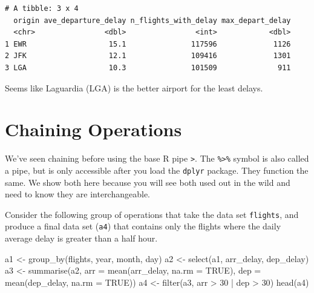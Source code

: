 \documentclass[
  letterpaper,
  DIV=11,
  numbers=noendperiod,
  oneside]{scrreprt}
\newenvironment{Shaded}{\begin{snugshade}}{\end{snugshade}}
\newcommand{\AttributeTok}[1]{\textcolor[rgb]{0.40,0.45,0.13}{#1}}
\newcommand{\ConstantTok}[1]{\textcolor[rgb]{0.56,0.35,0.01}{#1}}
\newcommand{\DecValTok}[1]{\textcolor[rgb]{0.68,0.00,0.00}{#1}}
\newcommand{\FunctionTok}[1]{\textcolor[rgb]{0.28,0.35,0.67}{#1}}
\newcommand{\NormalTok}[1]{\textcolor[rgb]{0.00,0.23,0.31}{#1}}
\newcommand{\OtherTok}[1]{\textcolor[rgb]{0.00,0.23,0.31}{#1}}
\newcommand{\SpecialCharTok}[1]{\textcolor[rgb]{0.37,0.37,0.37}{#1}}
\begin{document}
\begin{verbatim}
# A tibble: 3 x 4
  origin ave_departure_delay n_flights_with_delay max_depart_delay
  <chr>                <dbl>                <int>            <dbl>
1 EWR                   15.1               117596             1126
2 JFK                   12.1               109416             1301
3 LGA                   10.3               101509              911
\end{verbatim}

Seems like Laguardia (LGA) is the better airport for the least delays.

\section{Chaining Operations}\label{chaining-operations}

\begin{tcolorbox}[enhanced jigsaw, bottomrule=.15mm, colback=white, colframe=quarto-callout-important-color-frame, toprule=.15mm, coltitle=black, rightrule=.15mm, opacitybacktitle=0.6, colbacktitle=quarto-callout-important-color!10!white, toptitle=1mm, leftrule=.75mm, breakable, bottomtitle=1mm, titlerule=0mm, title=\textcolor{quarto-callout-important-color}{\faExclamation}\hspace{0.5em}{Same pipe, different symbol}, arc=.35mm, left=2mm, opacityback=0]

We've seen chaining before using the base R pipe
\texttt{\textbar{}\textgreater{}}. The \texttt{\%\textgreater{}\%}
symbol is also called a pipe, but is only accessible after you load the
\texttt{dplyr} package. They function the same. We show both here
because you will see both used out in the wild and need to know they are
interchangeable.

\end{tcolorbox}

Consider the following group of operations that take the data set
\texttt{flights}, and produce a final data set (\texttt{a4}) that
contains only the flights where the daily average delay is greater than
a half hour.

\begin{Shaded}
\begin{Highlighting}[]
\NormalTok{a1 }\OtherTok{\textless{}{-}} \FunctionTok{group\_by}\NormalTok{(flights, year, month, day)}
\NormalTok{a2 }\OtherTok{\textless{}{-}} \FunctionTok{select}\NormalTok{(a1, arr\_delay, dep\_delay)}
\NormalTok{a3 }\OtherTok{\textless{}{-}} \FunctionTok{summarise}\NormalTok{(a2,}
                \AttributeTok{arr =} \FunctionTok{mean}\NormalTok{(arr\_delay, }\AttributeTok{na.rm =} \ConstantTok{TRUE}\NormalTok{),}
                \AttributeTok{dep =} \FunctionTok{mean}\NormalTok{(dep\_delay, }\AttributeTok{na.rm =} \ConstantTok{TRUE}\NormalTok{))}
\NormalTok{a4 }\OtherTok{\textless{}{-}} \FunctionTok{filter}\NormalTok{(a3, arr }\SpecialCharTok{\textgreater{}} \DecValTok{30} \SpecialCharTok{|}\NormalTok{ dep }\SpecialCharTok{\textgreater{}} \DecValTok{30}\NormalTok{)}
\FunctionTok{head}\NormalTok{(a4)}
\end{Highlighting}
\end{Shaded}
\end{document}
